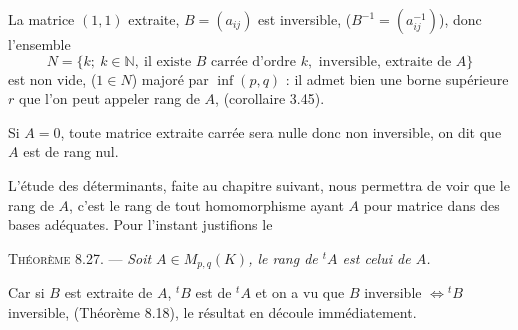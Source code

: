 La matrice $(1,1)$ extraite, $B=(a_{ij})$ est inversible, ($B^{-1}=(a_{ij}^{-1})$), donc l'ensemble
\[
N=\{k;\ k\in\mathbb N,\ \text{il existe }B\text{ carrée d'ordre }k,\text{ inversible, extraite de }A\}
\]
est non vide, ($1\in N$) majoré par $\inf(p,q)$ : il admet bien une borne supérieure $r$ que l'on peut appeler rang de $A$, (corollaire 3.45).

Si $A=0$, toute matrice extraite carrée sera nulle donc non inversible, on dit que $A$ est de rang nul.

L'étude des déterminants, faite au chapitre suivant, nous permettra de voir que le rang de $A$, c'est le rang de tout homomorphisme ayant $A$ pour matrice dans des bases adéquates. Pour l'instant justifions le

\medskip\noindent\textsc{Théorème 8.27.} --- \emph{Soit $A\in M_{p,q}(K)$, le rang de ${}^tA$ est celui de $A$.}

Car si $B$ est extraite de $A$, ${}^tB$ est  de ${}^tA$ et on a vu que $B$ inversible $\Longleftrightarrow{}^tB$ inversible, (Théorème 8.18), le résultat en découle immédiatement. \bookend
